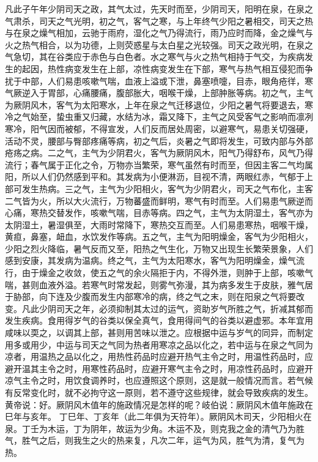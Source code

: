 \documentclass[a4paper,12pt,UTF8,twoside]{ctexbook}
\begin{document}
凡此子午年少阴司天之政，其气太过，先天时而至，少阴司天，阳明在泉，在泉之气肃杀，司天之气光明，初之气，客气之寒，与上年终气少阳之暑相交，司天之热与在泉之燥气相加，云驰于雨府，湿化之气乃得流行，雨乃应时而降，金之燥气与火之热气相合，以为功德，上则荧惑星与太白星之光较强。司天之政光明，在泉之气急切，其在谷类应于赤色与白色者。水之寒气与火之热气相持于气交，为疾病发生的起因，热性病变发生在上部，凉性病变发生在下部，寒气与热气相互侵犯而争扰于中部，人们易患咳嗽气喘，血液上溢或下泄，鼻塞喷嚏，目赤，眼角疮徉，寒气厥逆入于胃部，心痛腰痛，腹部胀大，咽喉干燥，上部肿胀等病。初之气，主气为厥阴风木，客气为太阳寒水，上年在泉之气迁移退位，少阳之暑气将要退去，寒冷之气始至，蛰虫重又归藏，水结为冰，霜又降下，主气之风受客气之影响而凛冽寒冷，阳气因而被郁，不得宣发，人们反而居处周密，以避寒气，易患关切强硬，活动不灵，腰部与臀部疼痛等病，初之气后，炎暑之气即将发生，可致内部与外部疮疡之病。二之气，主气为少阴君火，客气为厥阴风木，阳气乃得舒布，风气乃得流行；春气属于正化之令，万物亦当繁荣，寒气虽然有时而至，但因主客二气均属阳，所以人们仍然感到平和。其发病为小便淋沥，目视不清，两眼红赤，气郁于上部可发生热病。三之气，主气为少阳相火，客气为少阴君火，司天之气布化，主客二气皆为火，所以大火流行，万物蕃盛而鲜明，寒气有时而至。人们易患气厥逆而心痛，寒热交替发作，咳嗽气喘，目赤等病。四之气，主气为太阴湿土，客气亦为太阴湿土，暑湿俱至，大雨时常降下，寒热交互而至。人们易患寒热，咽喉干燥，黄疸，鼻塞，衄血，水饮发作等病。五之气，主气为阳明燥金，客气为少阳相火，少阳之烈火降临，暑气反而又至，阳热之气生化，万物又出现生长繁荣景象，人们感到安康，其发病为温病。终之气，主气为太阳寒水，客气为阳明燥金，燥气流行，由于燥金之收敛，使五之气的余火隔拒于内，不得外泄，则肿于上部，咳嗽气喘，甚则血液外溢。若寒气时常发起，则雾气弥漫，其为病多发生于皮肤，雅气居于胁部，向下连及少腹而发生内部寒冷的病，终之气之末，则在阳泉之气将要改变。凡此少阴司天之年，必须抑制其太过的运气，资助岁气所胜之气，折减其郁而发生疾病。食用得岁气的谷类以保全真气，食用得间气的谷类以避虚邪。本年宜用咸味以耎之，以调其上部，甚则用苦味以泄之。应根据中运与岁气的同异，而制定用多或用少，中运与司天之气同为热者用寒凉之品以化之，若中运与在泉之气同为凉者，用温热之品以化之，用热性药品时应避开热气主令之时，用温性药品时，应避开温其主令之时，用寒性药品时，应避开寒气主令之时，用凉性药品时，应避开凉气主令之时，用饮食调养时，也应遵照这个原则，这是就一般情况而言。若气候有反常变化时，就不必拘守这一原则，若不遵守这些规律，就会导致疾病的发生。
黄帝说：好。厥阴风木值年的施政情况是怎样的呢？岐伯说：厥阴风木值年施政在巳年与亥年。
丁巳年、丁亥年（此二年俱为天符年）。厥阴风木司天，少阳相火在泉。丁壬为木运，丁为阴年，故运为少角。木运不及，则克我之金的清气乃为胜气，胜气之后，则我生之火的热来复，凡次二年，运气为风，胜气为清，复气为热。
\end{document}
